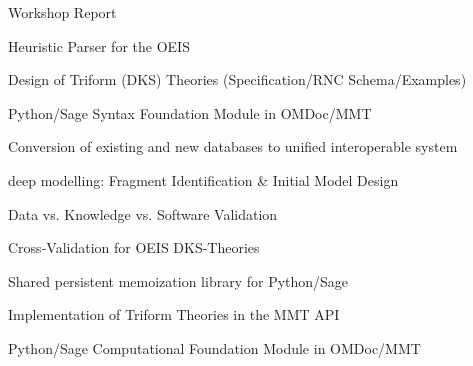 \begin{workpackage}[id=dksbases,wphases=1-48!.5,
  title=Data/Knowledge/Software-Bases,lead=JU,
  ZHRM=12,JURM=36,USHRM=12,UWRM=25,SARM=10,LLRM=2,PSRM=4]
\begin{wpdelivs}
  \begin{wpdeliv}[due=9,id=wsrep,dissem=PU,nature=R,lead=JU]{Workshop Report}
  \end{wpdeliv}
  \begin{wpdeliv}[due=9,id=oeisparser,dissem=PU,nature=OTHER,lead=JU]
      {Heuristic Parser for the OEIS}
  \end{wpdeliv}
  \begin{wpdeliv}[due=12,id=dkstheories,dissem=PU,nature=R,lead=JU]
        {Design of Triform (DKS) Theories (Specification/RNC Schema/Examples)}
  \end{wpdeliv}
  \begin{wpdeliv}[due=12,id=pssyntax,dissem=PU,nature=DEC,lead=JU]
        {Python/Sage Syntax Foundation Module in OMDoc/MMT}
  \end{wpdeliv}
  \begin{wpdeliv}[due=12,id=conv,dissem=PU,nature=DEC,lead=ZH]
        {Conversion of existing and new databases to unified interoperable system}
   \end{wpdeliv}
  \begin{wpdeliv}[due=12,id=lfmmod,dissem=PU,nature=R,lead=ZH]
      {\LMFDB deep modelling: Fragment Identification \& Initial Model Design}
  \end{wpdeliv}
  \begin{wpdeliv}[due=18,id=lfmval,dissem=PU,nature=R,lead=ZH]
      {\LMFDB Data vs. Knowledge vs. Software Validation}
  \end{wpdeliv}
  \begin{wpdeliv}[due=18,id=oeisvalidation,dissem=PU,nature=R,lead=JU]
      {Cross-Validation for OEIS DKS-Theories}
  \end{wpdeliv}
  \begin{wpdeliv}[due=24,id=persistent-memoization,dissem=PU,nature=OTHER,lead=SA]
    {Shared persistent memoization library for Python/Sage} 
  \end{wpdeliv}
  \begin{wpdeliv}[due=24,id=dksimp,dissem=PU,nature=OTHER,lead=JU]
        {Implementation of Triform Theories in the MMT API}
  \end{wpdeliv}
  \begin{wpdeliv}[due=24,id=psfoundation,dissem=PU,nature=OTHER,lead=JU]
        {Python/Sage Computational Foundation Module in OMDoc/MMT}
  \end{wpdeliv}
  \begin{wpdeliv}[due=36,id=pssem,dissem=PU,nature=OTHER,lead=JU]

\end{wpdeliv}
\end{wpdelivs}
\end{workpackage}
